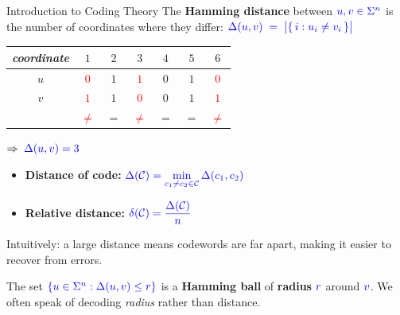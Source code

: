 \documentclass[10pt,handout]{beamer}
\begin{document}
\begin{frame}{Introduction to Coding Theory}
	The \textbf{Hamming distance} between $\textcolor{blue}{\textcolor{blue}{u, v \in \Sigma^n}}$ is the number of coordinates where they differ: $\textcolor{blue}{\textcolor{blue}{\Delta(u,v) \;=\; \bigl|\{\,i : u_i \neq v_i\,\}\bigr|}}$\pause

	\vspace{0.2em}
	\begin{center}
	{\normalcolor\renewcommand{\arraystretch}{1.1}%
	\begin{tabular}{c|cccccc}
		\textit{coordinate} & $1$ & $2$ & $3$ & $4$ & $5$ & $6$ \\\hline
		$u$ & \textcolor{red}{$0$} & $1$ & \textcolor{red}{$1$} & $0$ & $1$ & \textcolor{red}{$0$} \\
		$v$ & \textcolor{red}{$1$} & $1$ & \textcolor{red}{$0$} & $0$ & $1$ & \textcolor{red}{$1$} \\\hline
		    & \textcolor{red}{$\neq$} & $=$ & \textcolor{red}{$\neq$} & $=$ & $=$ & \textcolor{red}{$\neq$}
	\end{tabular}}%
	\quad ${\Rightarrow\; \textcolor{blue}{\textcolor{blue}{\Delta(u,v)=3}}}$
	\end{center}\pause

	\begin{itemize}
		\item \textbf{Distance of code:} $\textcolor{blue}{\textcolor{blue}{\Delta(\mathcal{C})=\min\limits_{c_1\neq c_2\in\mathcal{C}}\Delta(c_1,c_2)}}$
		\item \textbf{Relative distance:} $\textcolor{blue}{\textcolor{blue}{\delta(\mathcal{C})=\dfrac{\Delta(\mathcal{C})}{n}}}$
	\end{itemize}\pause

	\vspace{0.4em}
	Intuitively: a large distance means codewords are far apart, making it easier to recover from errors.\pause

	\vspace{0.3em}
	The set $\textcolor{blue}{\textcolor{blue}{\{u\in\Sigma^n : \Delta(u,v)\leq r\}}}$ is a \textbf{Hamming ball} of \textbf{radius} $\textcolor{blue}{\textcolor{blue}{r}}$ around $\textcolor{blue}{\textcolor{blue}{v}}$. We often speak of decoding \emph{radius} rather than distance.
\end{frame}
\end{document}
